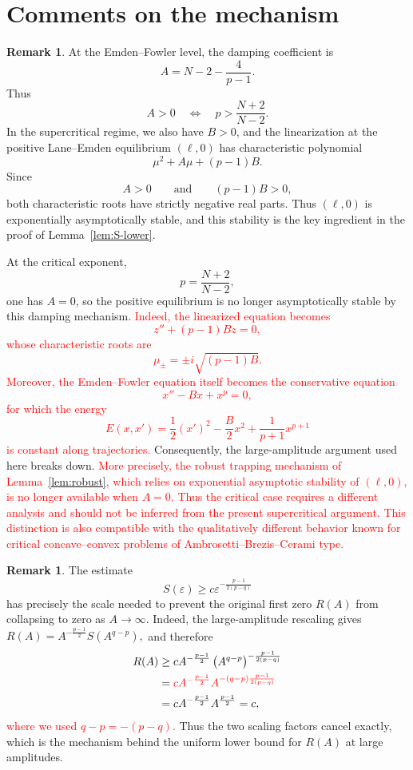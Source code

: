 \documentclass[11pt]{article}
\theoremstyle{definition}
\newtheorem{remark}[theorem]{Remark}
\begin{document}
  
\section{Comments on the mechanism}
\begin{remark}
At the Emden--Fowler level, the damping coefficient is
\[
A
=
N-2-\frac4{p-1}.
\]
Thus
\[
A>0
\quad\Longleftrightarrow\quad
p>\frac{N+2}{N-2}.
\]
In the supercritical regime, we also have $B>0$, and the
linearization at the positive Lane--Emden equilibrium $(\ell,0)$
has characteristic polynomial
\[
\mu^2+A\mu+(p-1)B.
\]
Since
\[
A>0
\qquad\text{and}\qquad
(p-1)B>0,
\]
both characteristic roots have strictly negative real parts.
Thus $(\ell,0)$ is exponentially asymptotically stable, and this
stability is the key ingredient in the proof of
Lemma~\ref{lem:S-lower}.

At the critical exponent,
\[
p=\frac{N+2}{N-2},
\]
one has $A=0$, so the positive equilibrium is no longer
asymptotically stable by this damping mechanism.
\textcolor{red}{Indeed, the linearized equation becomes
\[
z''+(p-1)Bz=0,
\]
whose characteristic roots are
\[
\mu_\pm=\pm i\sqrt{(p-1)B}.
\]
Moreover, the Emden--Fowler equation itself becomes the conservative
equation
\[
x''-Bx+x^p=0,
\]
for which the energy
\[
E(x,x')
=
\frac12(x')^2-\frac{B}{2}x^2+\frac1{p+1}x^{p+1}
\]
is constant along trajectories.}
Consequently, the
large-amplitude argument used here breaks down.
\textcolor{red}{More precisely, the robust trapping mechanism of
Lemma~\ref{lem:robust}, which relies on exponential asymptotic
stability of $(\ell,0)$, is no longer available when $A=0$.
Thus the critical case requires a different analysis and should not
be inferred from the present supercritical argument. This distinction
is also compatible with the qualitatively different behavior known
for critical concave--convex problems of
Ambrosetti--Brezis--Cerami type.}
\end{remark}

\begin{remark}
The estimate
\[
S(\varepsilon)
\geq
c\varepsilon^{-\frac{p-1}{2(p-q)}}
\]
has precisely the scale needed to prevent the original first zero
$R(A)$ from collapsing to zero as $A\to\infty$. Indeed, the
large-amplitude rescaling gives
\(
R(A)
=
A^{-\frac{p-1}{2}}
S(A^{q-p}),
\)
and therefore
\begin{align*}
R(A)
&\geq
cA^{-\frac{p-1}{2}}
\left(A^{q-p}\right)^{-\frac{p-1}{2(p-q)}}
\\
&=
\textcolor{red}{
cA^{-\frac{p-1}{2}}
A^{-(q-p)\frac{p-1}{2(p-q)}}
}
\\
&=
cA^{-\frac{p-1}{2}}
A^{\frac{p-1}{2}}
=
c,
\end{align*}
\textcolor{red}{where we used $q-p=-(p-q)$.}
Thus the two scaling factors cancel exactly, which is the mechanism
behind the uniform lower bound for $R(A)$ at large amplitudes.
\end{remark}
    
\end{document}
